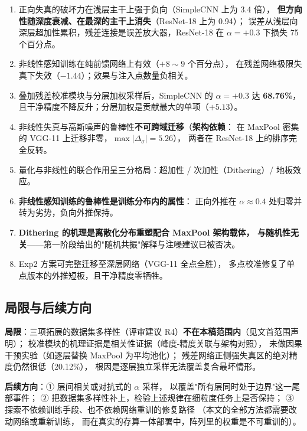 \documentclass[11pt,a4paper]{ctexart}
\begin{document}
\begin{enumerate}[leftmargin=2em,itemsep=2pt]
  \item 正向失真的破坏力在浅层主干上强于负向（SimpleCNN 上为 3.4 倍），
        \textbf{但方向性随深度衰减、在最深的主干上消失}（ResNet-18 上为 0.94）；
        误差从浅层向深层超加性累积，残差连接是误差放大器，ResNet-18 在 $\alpha=+0.3$ 下损失 75 个百分点。
  \item 非线性感知训练在纯前馈网络上有效（$+8\sim9$ 个百分点），
        在残差网络极限失真下失效（$-1.44$）；效果与注入点数量负相关。
  \item 叠加残差校准模块与分层加权采样后，SimpleCNN 的 $\alpha=+0.3$ 达 \textbf{68.76\%}，
        且干净精度不降反升；分层加权是贡献最大的单项（$+5.13$）。
  \item 非线性失真与高斯噪声的鲁棒性\textbf{不可跨域迁移}（\textbf{架构依赖}：
        在 MaxPool 密集的 VGG-11 上迁移非零，$\max|\Delta_\sigma|=5.26$），
        两者在 ResNet-18 上的排序完全反转。
  \item 量化与非线性的联合作用呈三分格局：超加性 / 次加性（Dithering）/ 地板效应。
  \item \textbf{非线性感知训练的鲁棒性是训练分布内的属性}：
        正向外推在 $\alpha\approx0.4$ 处归零并转为劣势，负向外推保持。
  \item \textbf{Dithering 的机理是离散化分布重塑配合 MaxPool 架构载体，
        与随机性无关}——第一阶段给出的"随机共振"解释与注噪建议已被否决。
  \item Exp2 方案可完整迁移至深层网络（VGG-11 全点全胜），
        多点校准修复了单点版本的外推短板，且干净精度零牺牲。
\end{enumerate}

\subsection{局限与后续方向}

\textbf{局限}：三项拓展的数据集多样性（评审建议 R4）\textbf{不在本稿范围内}（见文首范围声明）；
校准模块的机理证据是相关性证据（峰度-精度关联与架构对照），
未做因果干预实验（如逐层替换 MaxPool 为平均池化）；
残差网络正侧强失真区的绝对精度仍然很低（20.12\%），
根因是逐层独立采样无法覆盖复合最坏情形。

\textbf{后续方向}：① 层间相关或对抗式的 $\alpha$ 采样，
以覆盖"所有层同时处于边界"这一尾部事件；
② 把数据集多样性补上，检验上述规律在细粒度任务上是否保持；
③ 探索不依赖训练手段、也不依赖网络重训的修复路径
（本文的全部方法都需要改动网络或重新训练，
而在真实的存算一体部署中，阵列里的权重是不可重训的）。
\end{document}
